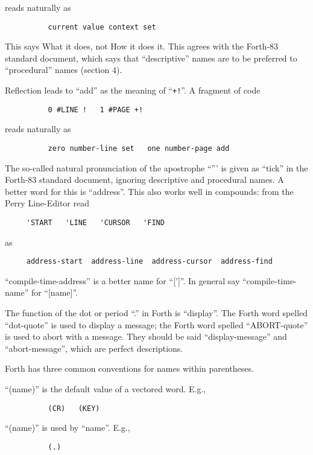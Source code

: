 reads naturally as
\begin{verbatim}
          current value context set
\end{verbatim}

This says What it does, not How it does it.  This  agrees  with
the  Forth-83  standard document, which says that ``descriptive''
names are to be preferred to ``procedural'' names (section 4).

Reflection leads to ``add''  as  the  meaning  of  ``\verb|+!|''.   A
fragment of code
\begin{verbatim}
          0 #LINE !   1 #PAGE +!
\end{verbatim}

reads naturally as
\begin{verbatim}
          zero number-line set   one number-page add
\end{verbatim}

The so-called natural pronunciation of the apostrophe  ``'''
is   given   as  ``tick''  in  the  Forth-83  standard  document,
ignoring  descriptive and procedural names.  A better word  for
this is ``address''.  This also works well in compounds: from the
Perry Line-Editor read
\begin{verbatim}
     'START   'LINE   'CURSOR   'FIND
\end{verbatim}

as
\begin{verbatim}
     address-start  address-line  address-cursor  address-find
\end{verbatim}

``compile-time-address''  is a better name for  ``[']''.   In
general say ``compile-time-name'' for ``[name]''.

The function  of  the  dot  or  period  ``.''  in  Forth  is
``display''.   The  Forth  word  spelled  ``dot-quote''  is used to
display a message; the Forth word spelled ``ABORT-quote'' is used
to abort with a message.  They should be said ``display-message''
and ``abort-message'', which are perfect descriptions.

Forth has three  common  conventions  for  names  within parentheses.

``(name)'' is the default value of a vectored word.  E.g.,
\begin{verbatim}
          (CR)   (KEY)
\end{verbatim}

``(name)'' is used by ``name''.  E.g.,
\begin{verbatim}
          (.)
\end{verbatim}

